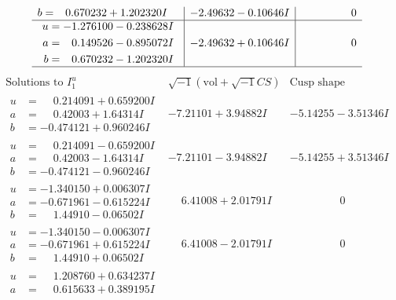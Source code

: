 \documentclass[1p]{elsarticle_modified}
\theoremstyle{definition}
\newcommand{\I}{\sqrt{-1}}
\begin{document}
$$\begin{array}{c|c|c}
\begin{aligned}
b &= \phantom{-}0.670232 + 1.202320 I\end{aligned}
 & -2.49632 - 0.10646 I & \phantom{-0.000000 } 0 \\ \hline\begin{aligned}
u &= -1.276100 - 0.238628 I \\
a &= \phantom{-}0.149526 - 0.895072 I \\
b &= \phantom{-}0.670232 - 1.202320 I\end{aligned}
 & -2.49632 + 0.10646 I & \phantom{-0.000000 } 0\\
 \hline 
 \end{array}$$\newpage$$\begin{array}{c|c|c}  
\text{Solutions to }I^u_{1}& \I (\text{vol} + \sqrt{-1}CS) & \text{Cusp shape}\\
 \hline 
\begin{aligned}
u &= \phantom{-}0.214091 + 0.659200 I \\
a &= \phantom{-}0.42003 + 1.64314 I \\
b &= -0.474121 + 0.960246 I\end{aligned}
 & -7.21101 + 3.94882 I & -5.14255 - 3.51346 I \\ \hline\begin{aligned}
u &= \phantom{-}0.214091 - 0.659200 I \\
a &= \phantom{-}0.42003 - 1.64314 I \\
b &= -0.474121 - 0.960246 I\end{aligned}
 & -7.21101 - 3.94882 I & -5.14255 + 3.51346 I \\ \hline\begin{aligned}
u &= -1.340150 + 0.006307 I \\
a &= -0.671961 - 0.615224 I \\
b &= \phantom{-}1.44910 - 0.06502 I\end{aligned}
 & \phantom{-}6.41008 + 2.01791 I & \phantom{-0.000000 } 0 \\ \hline\begin{aligned}
u &= -1.340150 - 0.006307 I \\
a &= -0.671961 + 0.615224 I \\
b &= \phantom{-}1.44910 + 0.06502 I\end{aligned}
 & \phantom{-}6.41008 - 2.01791 I & \phantom{-0.000000 } 0 \\ \hline\begin{aligned}
u &= \phantom{-}1.208760 + 0.634237 I \\
a &= \phantom{-}0.615633 + 0.389195 I \\

\end{aligned}
\end{array}$$
\end{document}
